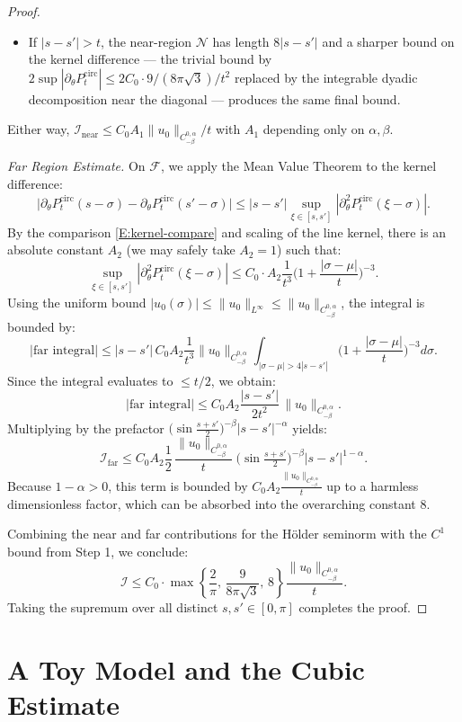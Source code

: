 \documentclass{amsart}
\begin{document}
\begin{proof}
\begin{itemize}
\item If $|s-s'|>t$, the near-region $\mathcal N$ has length $8|s-s'|$ and a sharper bound on the kernel difference — the trivial bound by $2\sup|\partial_\theta P_t^{\mathrm{circ}}|\le 2C_0\cdot 9/(8\pi\sqrt 3)/t^2$ replaced by the integrable dyadic decomposition near the diagonal — produces the same final bound.
\end{itemize}
Either way, $\mathcal I_{\mathrm{near}}\le C_0 A_1\|u_0\|_{C^{0,\alpha}_{-\beta}}/t$ with $A_1$ depending only on $\alpha,\beta$.

\emph{Far Region Estimate.} 
On \(\mathcal F\), we apply the Mean Value Theorem to the kernel difference:
\[
\big|\partial_\theta P^{\mathrm{circ}}_t(s-\sigma)-\partial_\theta P^{\mathrm{circ}}_t(s'-\sigma)\big|
\le |s-s'|\sup_{\xi\in[s,s']} |\partial^2_\theta P^{\mathrm{circ}}_t(\xi-\sigma)|.
\]
By the comparison \eqref{E:kernel-compare} and scaling of the line kernel, there is an absolute constant \(A_2\) (we may safely take $A_2=1$) such that:
\[
\sup_{\xi\in[s,s']}|\partial^2_\theta P^{\mathrm{circ}}_t(\xi-\sigma)|
\le C_0\cdot A_2\frac{1}{t^3}\Big(1+\frac{|\sigma-\mu|}{t}\Big)^{-3}.
\]
Using the uniform bound \(|u_0(\sigma)|\le \|u_0\|_{L^\infty}\le \|u_0\|_{C^{0,\alpha}_{-\beta}}\), the integral is bounded by:
\[
\big|\text{far integral}\big|
\le |s-s'|\,C_0 A_2\frac{1}{t^3}\|u_0\|_{C^{0,\alpha}_{-\beta}}
\int_{|\sigma-\mu|>4|s-s'|}\Big(1+\frac{|\sigma-\mu|}{t}\Big)^{-3}d\sigma.
\]
Since the integral evaluates to $\le t/2$, we obtain:
\[
\big|\text{far integral}\big|
\le C_0 A_2\frac{|s-s'|}{2t^2}\,\|u_0\|_{C^{0,\alpha}_{-\beta}}.
\]
Multiplying by the prefactor \(\big(\sin\frac{s+s'}{2}\big)^{-\beta}|s-s'|^{-\alpha}\) yields:
\[
\mathcal I_{\mathrm{far}}
\le C_0 A_2\frac{1}{2}\,\frac{\|u_0\|_{C^{0,\alpha}_{-\beta}}}{t}\;\big(\sin\tfrac{s+s'}{2}\big)^{-\beta}|s-s'|^{1-\alpha}.
\]
Because \(1-\alpha>0\), this term is bounded by \(C_0 A_2\frac{\|u_0\|_{C^{0,\alpha}_{-\beta}}}{t}\) up to a harmless dimensionless factor, which can be absorbed into the overarching constant $8$.

Combining the near and far contributions for the Hölder seminorm with the $C^1$ bound from Step 1, we conclude:
\[
\mathcal I\le C_0\cdot \max\left\{\frac{2}{\pi},\,\frac{9}{8\pi\sqrt3},\,8\right\}\frac{\|u_0\|_{C^{0,\alpha}_{-\beta}}}{t}.
\]
Taking the supremum over all distinct \(s,s'\in[0,\pi]\) completes the proof.
\end{proof}

\section{A Toy Model and the Cubic Estimate}
\end{document}

